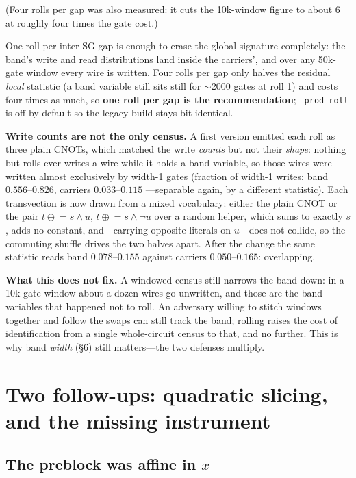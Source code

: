 \documentclass[11pt]{article}
\newcommand{\xor}{\oplus}
\begin{document}
\noindent (Four rolls per gap was also measured: it cuts the 10k-window figure
to about 6 at roughly four times the gate cost.)

One roll per inter-SG gap is enough to erase the global signature completely:
the band's write and read distributions land inside the carriers', and over any
50k-gate window every wire is written. Four rolls per gap only halves the
residual \emph{local} statistic (a band variable still sits still for
$\sim$2000 gates at roll 1) and costs four times as much, so \textbf{one roll
per gap is the recommendation}; \texttt{--prod-roll} is off by default so the
legacy build stays bit-identical.

\textbf{Write counts are not the only census.} A first version emitted each
roll as three plain CNOTs, which matched the write \emph{counts} but not their
\emph{shape}: nothing but rolls ever writes a wire while it holds a band
variable, so those wires were written almost exclusively by width-1 gates
(fraction of width-1 writes: band $0.556$--$0.826$, carriers $0.033$--$0.115$
---separable again, by a different statistic). Each transvection is now drawn
from a mixed vocabulary: either the plain CNOT or the pair
$t \mathrel{\xor}= s \wedge u$, $t \mathrel{\xor}= s \wedge \neg u$ over a
random helper, which sums to exactly $s$, adds no constant, and---carrying
opposite literals on $u$---does not collide, so the commuting shuffle drives
the two halves apart. After the change the same statistic reads band
$0.078$--$0.155$ against carriers $0.050$--$0.165$: overlapping.

\textbf{What this does not fix.} A windowed census still narrows the band down:
in a 10k-gate window about a dozen wires go unwritten, and those are the band
variables that happened not to roll. An adversary willing to stitch windows
together and follow the swaps can still track the band; rolling raises the cost
of identification from a single whole-circuit census to that, and no further.
This is why band \emph{width} (\S6) still matters---the two defenses multiply.

\section{Two follow-ups: quadratic slicing, and the missing instrument}

\subsection{The preblock was affine in $x$}
\end{document}
